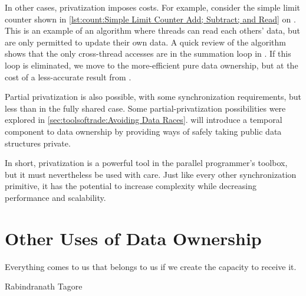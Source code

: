 In other cases, privatization imposes costs.
For example, consider the simple limit counter shown in
\cref{lst:count:Simple Limit Counter Add; Subtract; and Read} on
.
This is an example of an algorithm where threads can read each others'
data, but are only permitted to update their own data.
A quick review of the algorithm shows that the only cross-thread
accesses are in the summation loop in .
If this loop is eliminated, we move to the more-efficient pure
data ownership, but at the cost of a less-accurate result
from .

\QuickQuizEnd

Partial privatization is also possible, with some synchronization
requirements, but less than in the fully shared case.
Some partial-privatization possibilities were explored in
\cref{sec:toolsoftrade:Avoiding Data Races}.
 will introduce a temporal component
to data ownership by providing ways of safely taking public data
structures private.

In short, privatization is a powerful tool in the parallel programmer's
toolbox, but it must nevertheless be used with care.
Just like every other synchronization primitive, it has the potential
to increase complexity while decreasing performance and scalability.

\section{Other Uses of Data Ownership}
\label{sec:owned:Other Uses of Data Ownership}
%
\epigraph{Everything comes to us that belongs to us if we create the
	  capacity to receive it.}
	 {Rabindranath Tagore}

